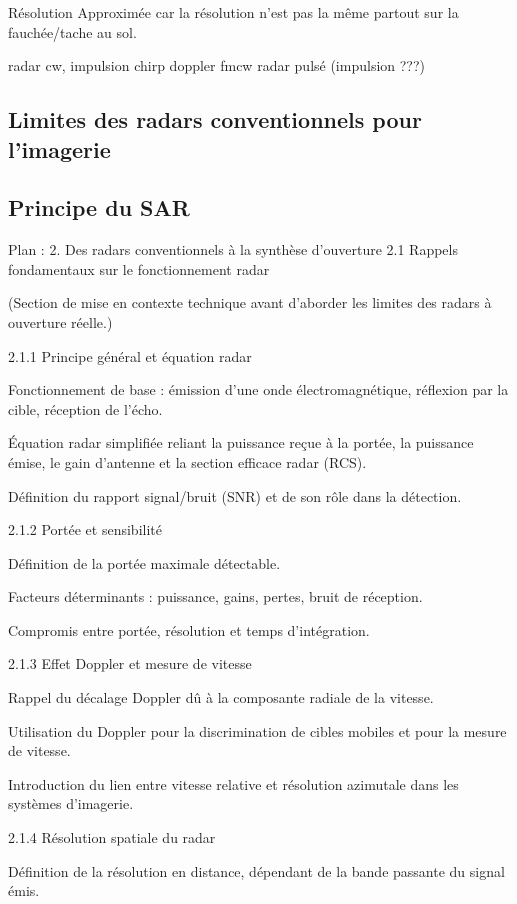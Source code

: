 Résolution Approximée car la résolution n'est pas la même partout sur la fauchée/tache au sol.

radar cw,
impulsion
chirp
doppler
fmcw
radar pulsé (impulsion ???)

\subsection{Limites des radars conventionnels pour l'imagerie}

\subsection{Principe du SAR}

Plan : 2. Des radars conventionnels à la synthèse d’ouverture
2.1 Rappels fondamentaux sur le fonctionnement radar

(Section de mise en contexte technique avant d’aborder les limites des radars à ouverture réelle.)

2.1.1 Principe général et équation radar

Fonctionnement de base : émission d’une onde électromagnétique, réflexion par la cible, réception de l’écho.

Équation radar simplifiée reliant la puissance reçue à la portée, la puissance émise, le gain d’antenne et la section efficace radar (RCS).

Définition du rapport signal/bruit (SNR) et de son rôle dans la détection.

2.1.2 Portée et sensibilité

Définition de la portée maximale détectable.

Facteurs déterminants : puissance, gains, pertes, bruit de réception.

Compromis entre portée, résolution et temps d’intégration.

2.1.3 Effet Doppler et mesure de vitesse

Rappel du décalage Doppler dû à la composante radiale de la vitesse.

Utilisation du Doppler pour la discrimination de cibles mobiles et pour la mesure de vitesse.

Introduction du lien entre vitesse relative et résolution azimutale dans les systèmes d’imagerie.

2.1.4 Résolution spatiale du radar

Définition de la résolution en distance, dépendant de la bande passante du signal émis.

